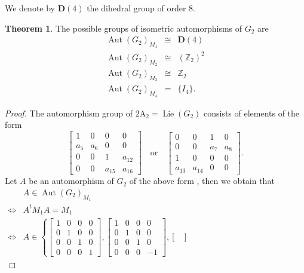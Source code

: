 \documentclass[12pt,a4paper,twoside]{article}
\theoremstyle{definition}
\newtheorem{theorem}{Theorem}[section]
\begin{document}
We denote by $\mathbf{D}(4)$ the dihedral group of order $8$.
\begin{theorem} \label{possiblegroups}
The possible groups of isometric automorphisms of $G_2$ are
\begin{eqnarray*}
\operatorname{Aut}\left(G_2\right)_{M_1}  &\cong& \mathbf{D}(4)\\
\operatorname{Aut}\left(G_2\right)_{M_2}  &\cong& \left(\mathbb{Z}_2\right)^2\\
\operatorname{Aut}\left(G_2\right)_{M_3}  &\cong& \mathbb{Z}_2\\
\operatorname{Aut}\left(G_2\right)_{M_4}  &=& \{I_4\}.
\end{eqnarray*}
\end{theorem}
\begin{proof}
The automorphism group of $\operatorname{2A_2} = \operatorname{Lie}(G_2)$ consists of elements of the form \cite{christodoulakis2003automorphisms}
$$\begin{bmatrix}
1 & 0 & 0 & 0\\
a_5 & a_6 & 0 & 0\\
0 & 0 & 1 & a_{12}\\
0 & 0 & a_{15} & a_{16}
\end{bmatrix} \quad \text{or}\quad \begin{bmatrix}
0 & 0 & 1 & 0\\
0 & 0 & a_{7} & a_{8}\\
1 & 0 & 0 & 0\\
a_{13} & a_{14} & 0 & 0
\end{bmatrix}.
$$
Let $A$ be an automorphism of $G_2$ of the above form , then we obtain that
\begin{eqnarray*}
& A \in \operatorname{Aut}\left(G_2\right)_{M_1}\hspace{13cm}\\ \Leftrightarrow & A^tM_1A = M_1\hspace{13cm}\\
\Leftrightarrow & A \in \left\lbrace \begin{bmatrix}
1 & 0 & 0 & 0\\
0 & 1 & 0 & 0\\
0 & 0 & 1 & 0\\
0 & 0 & 0 & 1
\end{bmatrix}, \begin{bmatrix}
1 & 0 & 0 & 0\\
0 & 1 & 0 & 0\\
0 & 0 & 1 & 0\\
0 & 0 & 0 & -1
\end{bmatrix}, \begin{bmatrix}

\end{bmatrix}
\end{eqnarray*}
\end{proof}
\end{document}
